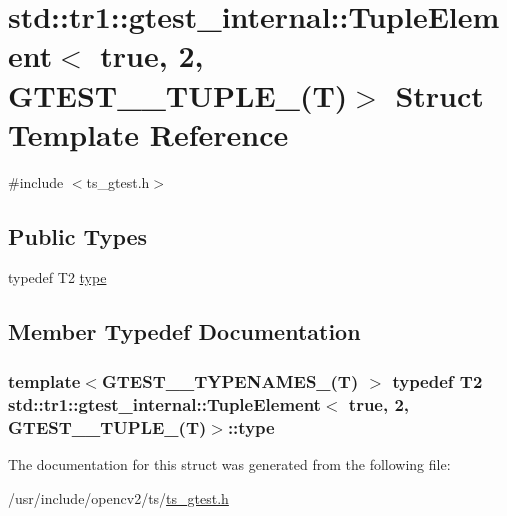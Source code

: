 \hypertarget{structstd_1_1tr1_1_1gtest__internal_1_1TupleElement_3_01true_00_012_00_01GTEST__10__TUPLE___07T_08_4}{\section{std\-:\-:tr1\-:\-:gtest\-\_\-internal\-:\-:Tuple\-Element$<$ true, 2, G\-T\-E\-S\-T\-\_\-\_\-\-T\-U\-P\-L\-E\-\_\-(T)$>$ Struct Template Reference}
\label{structstd_1_1tr1_1_1gtest__internal_1_1TupleElement_3_01true_00_012_00_01GTEST__10__TUPLE___07T_08_4}
}


{\ttfamily \#include $<$ts\-\_\-gtest.\-h$>$}

\subsection*{Public Types}
\begin{DoxyCompactItemize}
\item 
typedef T2 \hyperlink{structstd_1_1tr1_1_1gtest__internal_1_1TupleElement_3_01true_00_012_00_01GTEST__10__TUPLE___07T_08_4_ad7c1453c79915f8da94dbd8547c5242a}{type}
\end{DoxyCompactItemize}


\subsection{Member Typedef Documentation}
\hypertarget{structstd_1_1tr1_1_1gtest__internal_1_1TupleElement_3_01true_00_012_00_01GTEST__10__TUPLE___07T_08_4_ad7c1453c79915f8da94dbd8547c5242a}{
\subsubsection[{type}]{\setlength{\rightskip}{0pt plus 5cm}template$<$G\-T\-E\-S\-T\-\_\-\_\-\-T\-Y\-P\-E\-N\-A\-M\-E\-S\-\_\-(\-T) $>$ typedef T2 {\bf std\-::tr1\-::gtest\-\_\-internal\-::\-Tuple\-Element}$<$ true, 2, {\bf G\-T\-E\-S\-T\-\_\-\_\-\-T\-U\-P\-L\-E\-\_\-}({\bf T})$>$\-::{\bf type}}}\label{structstd_1_1tr1_1_1gtest__internal_1_1TupleElement_3_01true_00_012_00_01GTEST__10__TUPLE___07T_08_4_ad7c1453c79915f8da94dbd8547c5242a}


The documentation for this struct was generated from the following file\-:\begin{DoxyCompactItemize}
\item 
/usr/include/opencv2/ts/\hyperlink{ts__gtest_8h}{ts\-\_\-gtest.\-h}\end{DoxyCompactItemize}
